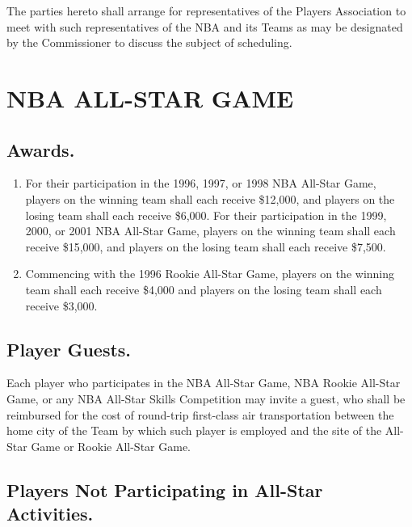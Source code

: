 \documentclass[
]{book}
\providecommand{\tightlist}{%
  \setlength{\itemsep}{0pt}\setlength{\parskip}{0pt}}
\begin{document}
The parties hereto shall arrange for representatives of the Players Association to meet with such representatives of the NBA and its Teams as may be designated by the Commissioner to discuss the subject of scheduling.

\hypertarget{nba-all-star-game}{%
\chapter{NBA ALL-STAR GAME}\label{nba-all-star-game}}

\hypertarget{awards.}{%
\section{Awards.}\label{awards.}}

\begin{enumerate}
\def\labelenumi{(\alph{enumi})}
\tightlist
\item
  For their participation in the 1996, 1997, or 1998 NBA All-Star Game, players on the winning team shall each receive \$12,000, and players on the losing team shall each receive \$6,000. For their participation in the 1999, 2000, or 2001 NBA All-Star Game, players on the winning team shall each receive \$15,000, and players on the losing team shall each receive \$7,500.
\item
  Commencing with the 1996 Rookie All-Star Game, players on the winning team shall each receive \$4,000 and players on the losing team shall each receive \$3,000.
\end{enumerate}

\hypertarget{player-guests.}{%
\section{Player Guests.}\label{player-guests.}}

Each player who participates in the NBA All-Star Game, NBA Rookie All-Star Game, or any NBA All-Star Skills Competition may invite a guest, who shall be reimbursed for the cost of round-trip first-class air transportation between the home city of the Team by which such player is employed and the site of the All-Star Game or Rookie All-Star Game.

\hypertarget{players-not-participating-in-all-star-activities.}{%
\section{Players Not Participating in All-Star Activities.}\label{players-not-participating-in-all-star-activities.}}
\end{document}
